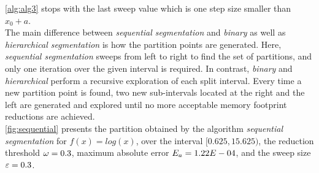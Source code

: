 \cref{alg:alg3} stops with the last sweep value which is one step size smaller than $x_0+a$.\\
The main difference between \textit{sequential segmentation} and \textit{binary} as well as \textit{hierarchical segmentation} is how the partition points are generated. 
Here, \textit{sequential segmentation} sweeps from left to right to find the set of partitions, and only one iteration over the given interval is required.
In contrast, \textit{binary} and \textit{hierarchical} perform a recursive exploration of each split interval. 
Every time a new partition point is found, two new sub-intervals located at the right and the left are generated and explored until no more acceptable memory footprint reductions are achieved. \\
\cref{fig:sequential} presents the partition obtained by the algorithm \textit{sequential segmentation} for $f(x)=log(x)$, over the interval $[0.625,15.625)$, the reduction threshold $\omega=0.3$, maximum absolute error $E_a=1.22E-04$, and the sweep size $\varepsilon=0.3$.
